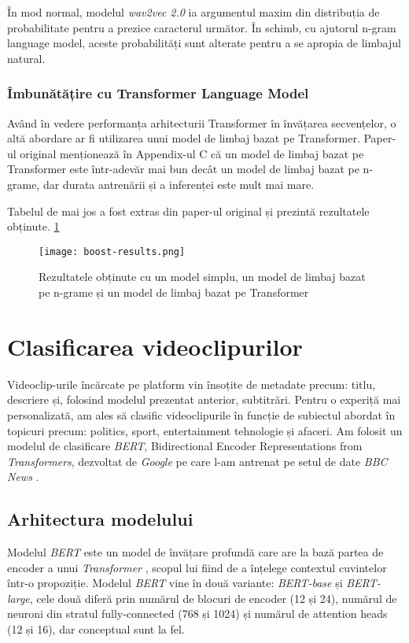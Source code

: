 \par
În mod normal, modelul \textit{wav2vec 2.0} ia argumentul maxim din distribuția de probabilitate
pentru a prezice caracterul următor. În schimb, cu ajutorul n-gram language model, aceste
probabilități sunt alterate pentru a se apropia de limbajul natural. 

\subsubsection{Îmbunătățire cu Transformer Language Model}
\vspace{1em}
Având în vedere performanța arhitecturii Transformer în învățarea secvențelor, o altă abordare
ar fi utilizarea unui model de limbaj bazat pe Transformer. Paper-ul original \cite{wav2vec2}
menționează în Appendix-ul C că un model de limbaj bazat pe Transformer este într-adevăr mai
bun decât un model de limbaj bazat pe n-grame, dar durata antrenării și a inferenței este
mult mai mare. 
\par 
Tabelul de mai jos a fost extras din paper-ul original și prezintă rezultatele obținute. \ref{fig:boost-results}

\begin{figure}[h!]
    \centering
    \texttt{[image: boost-results.png]}
    \caption{Rezultatele obținute cu un model simplu, un model de limbaj bazat pe n-grame și un model de limbaj bazat pe Transformer}
    \label{fig:boost-results}
\end{figure}


\section{Clasificarea videoclipurilor}
\label{sec:clasificare-videoclipuri}
Videoclip-urile încărcate pe platform vin însoțite de metadate precum: titlu, descriere și, folosind
modelul prezentat anterior, subtitrări. Pentru o experiță mai personalizată, am ales să clasific
videoclipurile în funcție de subiectul abordat în topicuri precum: politics, sport, entertainment
tehnologie și afaceri. Am folosit un modelul de clasificare \textit{BERT}, Bidirectional Encoder Representations
from \textit{Transformers}, dezvoltat de \textit{Google} \cite{devlin2019bert} pe care l-am antrenat pe setul de date
\textit{BBC News} \cite{greene06icml}.

\subsection{Arhitectura modelului}
Modelul \textit{BERT} este un model de învățare profundă care are la bază partea de encoder a unui \textit{Transformer} \cite{vaswani2023attention},
scopul lui fiind de a înțelege contextul cuvintelor într-o propoziție. Modelul \textit{BERT} vine în două
variante: \textit{BERT-base} și \textit{BERT-large}, cele două diferă prin numărul de blocuri de encoder (12 și 24),
numărul de neuroni din stratul fully-connected (768 și 1024) și numărul de attention heads (12 și 16), dar 
conceptual sunt la fel. 

